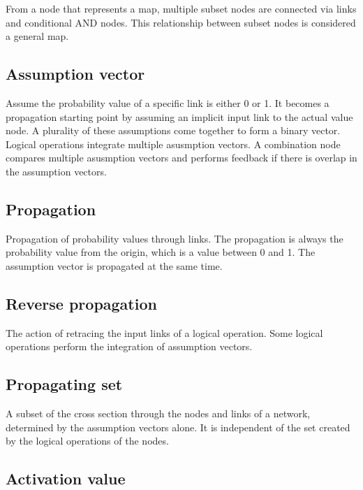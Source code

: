 \documentclass[12pt]{article}
\begin{document}
From a node that represents a map, multiple subset nodes are connected
via links and conditional AND nodes. This relationship between subset
nodes is considered a general map.

\subsection*{Assumption vector}\label{glossary-assumption-vector}

Assume the probability value of a specific link is either 0 or 1. It
becomes a propagation starting point by assuming an implicit input link
to the actual value node. A plurality of these assumptions come together
to form a binary vector. Logical operations integrate multiple
asusmption vectors. A combination node compares multiple asusmption
vectors and performs feedback if there is overlap in the assumption
vectors.

\subsection*{Propagation}\label{glossary-propagation}

Propagation of probability values through links. The propagation is
always the probability value from the origin, which is a value between 0
and 1. The assumption vector is propagated at the same time.

\subsection*{Reverse propagation}\label{glossary-reverse-propagation}

The action of retracing the input links of a logical operation. Some
logical operations perform the integration of assumption vectors.

\subsection*{Propagating set}\label{glossary-propagating-set}

A subset of the cross section through the nodes and links of a network,
determined by the assumption vectors alone. It is independent of the set
created by the logical operations of the nodes.

\subsection*{Activation value}\label{glossary-activation-value}
\end{document}
